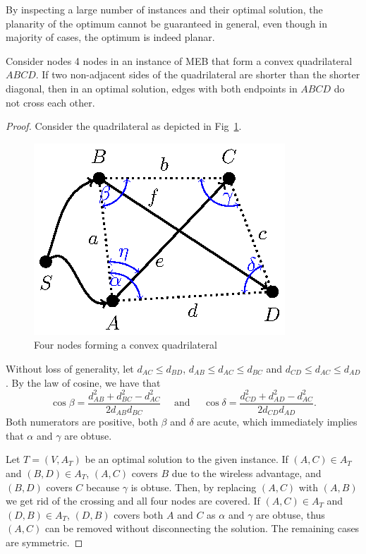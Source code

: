 By inspecting a large number of instances and their optimal solution, the planarity of the optimum cannot be guaranteed in general, even though in majority of cases, the optimum is indeed planar.
\begin{proposition}\label{prop:mebplan}
Consider nodes 4 nodes in an instance of MEB that form a convex quadrilateral $ABCD$.
If two non-adjacent sides of the quadrilateral are shorter than the shorter diagonal, then in an optimal solution, edges with both endpoints in $ABCD$ do not cross each other.
\end{proposition}
\begin{proof}
Consider the quadrilateral as depicted in Fig~\ref{fig:quad}. 
\begin{figure}[htb!]
  \centering
  \includegraphics[scale=1.4]{figurer/quadrilat.eps}
  \caption{Four nodes forming a convex quadrilateral}
  \label{fig:quad}
\end{figure}
Without loss of generality, let $d_{AC}\leq d_{BD}$, $d_{AB}\leq d_{AC}\leq d_{BC}$ and $d_{CD}\leq d_{AC}\leq d_{AD}$.
By the law of cosine, we have that 
$$
\cos{\beta}=\frac{d^2_{AB} + d^2_{BC} - d^2_{AC}}{2d_{AB}d_{BC}} \text{~~~ and ~~~}\cos{\delta}=\frac{d^2_{CD} + d^2_{AD} - d^2_{AC}}{2d_{CD}d_{AD}}.
$$
Both numerators are positive, both $\beta$ and $\delta$ are acute, which immediately implies that $\alpha $ and $\gamma$ are obtuse.

Let $T=(V,A_T)$ be an optimal solution to the given instance.
If $(A,C)\in A_T$ and $(B,D)\in A_T$, $(A,C)$ covers $B$ due to the wireless advantage, and $(B,D)$ covers $C$ because $\gamma$ is obtuse.
Then, by replacing $(A,C)$ with $(A,B)$ we get rid of the crossing and all four nodes are covered.
If $(A,C)\in A_T$ and $(D,B)\in A_T$, $(D,B)$ covers both $A$ and $C$ as $\alpha$ and $\gamma$ are obtuse, thus $(A,C)$ can be removed without disconnecting the solution.
The remaining cases are symmetric.
\end{proof}
